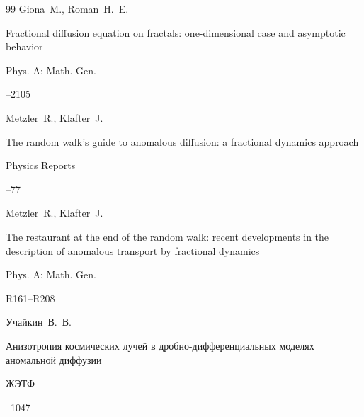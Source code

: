\begin{thebibliography}{99}
\by Giona~M., Roman~H.~E.

\paper Fractional diffusion equation on fractals: one-dimensional case and asymptotic behavior

\jour Phys. A: Math. Gen.




--2105





\by Metzler~R., Klafter~J.

\paper The random walk's guide to anomalous diffusion: a fractional dynamics  approach 

\jour Physics Reports




--77





\by Metzler~R., Klafter~J.

\paper The restaurant at the end of the random walk: recent developments in the description of anomalous transport by fractional dynamics

\jour Phys. A: Math. Gen.




\pages R161--R208









\by Учайкин~В.~В. 

\paper Анизотропия космических лучей в дробно-дифференциальных моделях аномальной диффузии

\jour ЖЭТФ




--1047







\end{thebibliography}
